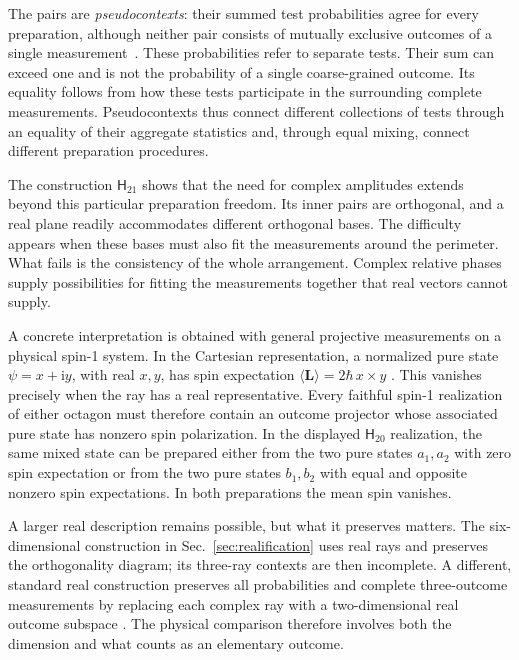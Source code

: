 \documentclass[12pt,a4paper]{article}
\theoremstyle{definition}
\theoremstyle{remark}
\newcommand{\ii}{\mathrm{i}}
\newcommand{\Htwenty}{\mathsf H_{20}}
\newcommand{\Htwentyone}{\mathsf H_{21}}
\begin{document}
The pairs are \emph{pseudocontexts}: their summed test probabilities agree
for every preparation, although neither pair consists of mutually exclusive
outcomes of a single measurement~\cite{2026-Navara-Svozil-pseudocontexts}.
These probabilities refer to separate tests.  Their sum can exceed one and
is not the probability of a single coarse-grained outcome.  Its equality
follows from how these tests participate in the surrounding complete
measurements.  Pseudocontexts thus
connect different collections of tests through an equality of their
aggregate statistics and, through equal mixing, connect different
preparation procedures.

The construction $\Htwentyone$ shows that the need for complex amplitudes
extends beyond this particular preparation freedom.  Its inner pairs are
orthogonal, and a real plane readily accommodates different orthogonal
bases.  The difficulty appears when these bases must also fit the
measurements around the perimeter.  What fails is the consistency of the
whole arrangement.  Complex relative phases supply possibilities for
fitting the measurements together that real vectors cannot supply.

A concrete interpretation is obtained with general projective measurements
on a physical spin-1 system.  In the Cartesian representation, a normalized
pure state $\psi=x+\ii y$, with real $x,y$, has spin expectation
$\langle\mathbf L\rangle=2\hbar\,x\times y$
\cite{ZiboldEtAl2016SpinNematic}.  This vanishes precisely when the ray has
a real representative.  Every faithful spin-1 realization of either
octagon must therefore contain an outcome projector whose associated pure
state has nonzero spin polarization.  In the displayed $\Htwenty$
realization, the same mixed state can be prepared either from the two pure
states $a_1,a_2$ with zero spin expectation or from the two pure states
$b_1,b_2$ with equal and opposite nonzero spin expectations.  In both
preparations the mean spin vanishes.

A larger real description remains possible, but what it preserves matters.
The six-dimensional construction in Sec.~\ref{sec:realification} uses real
rays and preserves the orthogonality diagram; its three-ray contexts are
then incomplete.  A different, standard real construction preserves all
probabilities and complete three-outcome measurements by replacing each
complex ray with a two-dimensional real outcome subspace
\cite{McKague2009SimulatingRealHilbert,Aleksandrova2013UniversalQubit}.
The physical comparison therefore involves both the dimension and what
counts as an elementary outcome.
\end{document}
